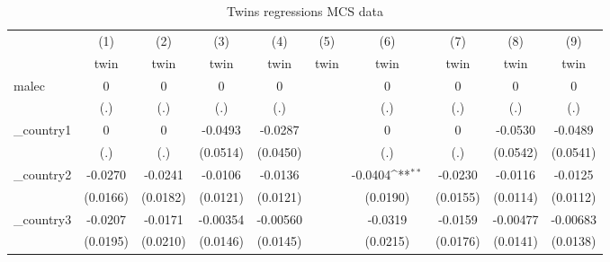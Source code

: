 \begin{table}[htbp]\centering
\def\sym#1{\ifmmode^{#1}\else\(^{#1}\)\fi}
\caption{Twins regressions MCS data}
\begin{tabular}{l*{9}{c}}
\hline\hline
            &\multicolumn{1}{c}{(1)}&\multicolumn{1}{c}{(2)}&\multicolumn{1}{c}{(3)}&\multicolumn{1}{c}{(4)}&\multicolumn{1}{c}{(5)}&\multicolumn{1}{c}{(6)}&\multicolumn{1}{c}{(7)}&\multicolumn{1}{c}{(8)}&\multicolumn{1}{c}{(9)}\\
            &\multicolumn{1}{c}{twin}&\multicolumn{1}{c}{twin}&\multicolumn{1}{c}{twin}&\multicolumn{1}{c}{twin}&\multicolumn{1}{c}{twin}&\multicolumn{1}{c}{twin}&\multicolumn{1}{c}{twin}&\multicolumn{1}{c}{twin}&\multicolumn{1}{c}{twin}\\
\hline
malec       &           0         &           0         &           0         &           0         &                     &           0         &           0         &           0         &           0         \\
            &         (.)         &         (.)         &         (.)         &         (.)         &                     &         (.)         &         (.)         &         (.)         &         (.)         \\
[1em]
\_country1   &           0         &           0         &     -0.0493         &     -0.0287         &                     &           0         &           0         &     -0.0530         &     -0.0489         \\
            &         (.)         &         (.)         &    (0.0514)         &    (0.0450)         &                     &         (.)         &         (.)         &    (0.0542)         &    (0.0541)         \\
[1em]
\_country2   &     -0.0270         &     -0.0241         &     -0.0106         &     -0.0136         &                     &     -0.0404\sym{**} &     -0.0230         &     -0.0116         &     -0.0125         \\
            &    (0.0166)         &    (0.0182)         &    (0.0121)         &    (0.0121)         &                     &    (0.0190)         &    (0.0155)         &    (0.0114)         &    (0.0112)         \\
[1em]
\_country3   &     -0.0207         &     -0.0171         &    -0.00354         &    -0.00560         &                     &     -0.0319         &     -0.0159         &    -0.00477         &    -0.00683         \\
            &    (0.0195)         &    (0.0210)         &    (0.0146)         &    (0.0145)         &                     &    (0.0215)         &    (0.0176)         &    (0.0141)         &    (0.0138)         \\

\end{tabular}
\end{table}
